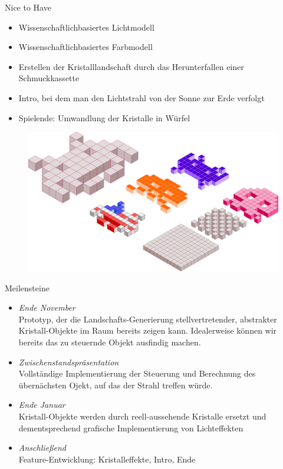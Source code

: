 \slideonetoone
{Nice to Have}
{
	\begin{itemize}
		\item Wissenschaftlichbasiertes Lichtmodell 
		\item Wissenschaftlichbasiertes Farbmodell
		\item Erstellen der Kristalllandschaft durch das Herunterfallen einer Schmuckkassette
		\item Intro, bei dem man den Lichtstrahl von der Sonne zur Erde verfolgt
		\item Spielende: Umwandlung der Kristalle in Würfel
	\end{itemize}
}
{
	\begin{figure}
		\centering
		\includegraphics[width=\textwidth, height=0.7\textheight, keepaspectratio]{images/space-invaders-151432}
	\end{figure}
}

\begin{frame}{Meilensteine}
	\begin{itemize}
		\item \emph{Ende November}\\
		Prototyp, der die Landschafts-Generierung stellvertretender, abstrakter Kristall-Objekte im Raum bereits zeigen kann. Idealerweise können wir bereits das zu steuernde Objekt ausfindig machen.
		\item \emph{Zwischenstandspräsentation}\\
		Vollständige Implementierung der Steuerung und Berechnung des übernächsten Ojekt, auf das der Strahl treffen würde.
		\item \emph{Ende Januar}\\
		Kristall-Objekte werden durch reell-aussehende Kristalle ersetzt und dementsprechend grafische Implementierung von Lichteffekten
		\item \emph{Anschließend}\\
		Feature-Entwicklung: Kristalleffekte, Intro, Ende
	\end{itemize}
\end{frame}



